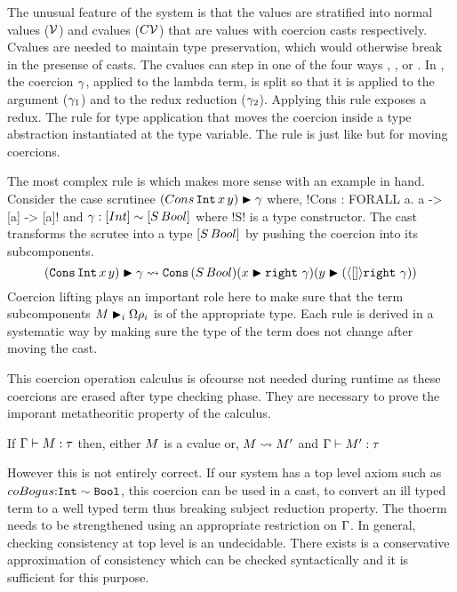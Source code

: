 \documentclass[manuscript,screen,nonacm]{acmart}
\begin{document}
The unusual feature of the system is that the values are stratified into normal values ($\mathcal{V}$) and cvalues ($C\mathcal{V}$) that are values with coercion casts respectively. Cvalues are needed to maintain type preservation, which would otherwise break in the presense of casts. The cvalues can step in one of the four ways , ,  or . In , the coercion $\gamma$, applied to the lambda term, is split so that it is applied to the argument ($\gamma_1$) and to the redux reduction ($\gamma_2$). Applying this rule exposes a \trule{$\beta$} redux. The rule  for type application that moves the coercion inside a type abstraction instantiated at the type variable.
The rule  is just like  but for moving coercions.

The most complex rule is  which makes more sense with an example in hand. Consider the case scrutinee $(Cons\, \texttt{Int}\, x\, y)\mathrel{\blacktriangleright}\gamma$ where, !Cons : FORALL a. a -> [a] -> [a]! and $\gamma : [Int] \sim [S\, Bool]$ where !S! is a type constructor. The cast transforms the scrutee into a type $[S\, Bool]$ by pushing the coercion into its subcomponents.
$$
(\texttt{Cons}\, \texttt{Int}\, x\, y)\mathrel{\blacktriangleright}\gamma \rightsquigarrow \texttt{Cons} \, (S\, Bool) (x\mathrel{\blacktriangleright}\texttt{right}~\gamma) (y\mathrel{\blacktriangleright}(\langle[]\rangle\texttt{right}~\gamma))
$$
Coercion lifting plays an important role here to make sure that the term subcomponents $M\mathrel{\blacktriangleright}_i {\Omega}\rho_i$ is of the appropriate type. Each rule is derived in a systematic way by making sure the type of the term does not change after moving the cast.

This coercion operation calculus is ofcourse not needed during runtime as these coercions are erased after type checking phase. They are necessary to prove the imporant metatheoritic property of the calculus.

\begin{theorem}
  If $\Gamma \vdash M : \tau$ then, either $M$ is a cvalue or, $M \rightsquigarrow M'$ and
  $\Gamma \vdash M' : \tau$
\end{theorem}

However this is not entirely correct. If our system has a top level axiom such as $coBogus {:} \texttt{Int} \sim \texttt{Bool}$, this coercion can be used in a cast, to convert an ill typed term to a well typed term thus breaking subject reduction property. The thoerm needs to be strengthened using an appropriate restriction on $\Gamma$. In general, checking consistency at top level is an undecidable. There exists is a conservative approximation of consistency which can be checked syntactically and it is sufficient for this purpose.
\end{document}
